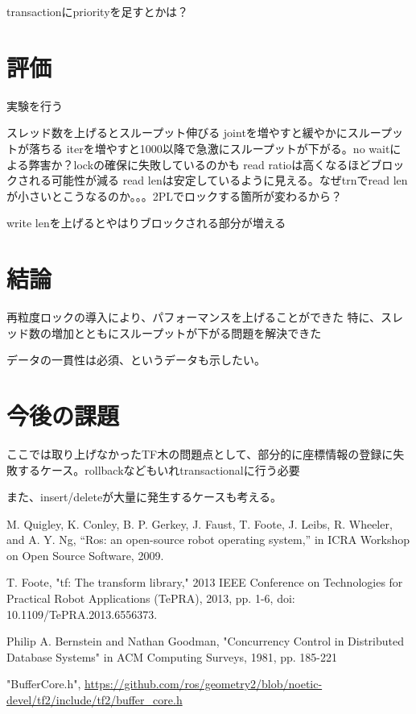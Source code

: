 \documentclass{jarticle}
\begin{document}
\begin{multicols}{2}
transactionにpriorityを足すとかは？



\section{評価}
実験を行う

スレッド数を上げるとスループット伸びる
jointを増やすと緩やかにスループットが落ちる
iterを増やすと1000以降で急激にスループットが下がる。no waitによる弊害か？lockの確保に失敗しているのかも
read ratioは高くなるほどブロックされる可能性が減る
read lenは安定しているように見える。なぜtrnでread lenが小さいとこうなるのか。。。2PLでロックする箇所が変わるから？

write lenを上げるとやはりブロックされる部分が増える



\section{結論}

再粒度ロックの導入により、パフォーマンスを上げることができた
特に、スレッド数の増加とともにスループットが下がる問題を解決できた

データの一貫性は必須、というデータも示したい。

\section{今後の課題}

ここでは取り上げなかったTF木の問題点として、部分的に座標情報の登録に失敗するケース。rollbackなどもいれtransactionalに行う必要

また、insert/deleteが大量に発生するケースも考える。

	
\begin{thebibliography}{99}

 M. Quigley, K. Conley, B. P. Gerkey, J. Faust, T. Foote, J. Leibs, R. Wheeler, and A. Y. Ng, “Ros: an open-source robot operating system,” in ICRA Workshop on Open Source Software, 2009.

 T. Foote, "tf: The transform library," 2013 IEEE Conference on Technologies for Practical Robot Applications (TePRA), 2013, pp. 1-6, doi: 10.1109/TePRA.2013.6556373.

 Philip A. Bernstein and Nathan Goodman, "Concurrency Control in Distributed Database Systems" in ACM Computing Surveys, 1981, pp. 185-221

 "BufferCore.h", \url{https://github.com/ros/geometry2/blob/noetic-devel/tf2/include/tf2/buffer_core.h}


\end{thebibliography}
\end{multicols}
\end{document}
